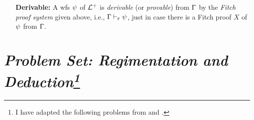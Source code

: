 \documentclass[a4paper, 11pt]{article} %
\begin{document}
\begin{enumerate}
	\item[\bf Derivable:]
	      A wfs $\psi$ of $\mathcal{L}^+$ is \textit{derivable} (or \textit{provable}) from $\Gamma$ by the \textit{Fitch proof system} given above, i.e., $\Gamma \vdash_{\textsc{f}} \psi$, just in case there is a Fitch proof $X$ of $\psi$ from $\Gamma$.
\end{enumerate}



\section*{\it Problem Set: Regimentation and Deduction\footnote{I have adapted the following problems from \citet{Goldfarb2003} and \citet{Laboreo2005}.}}
\end{document}
